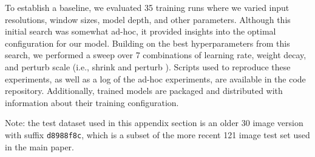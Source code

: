 To establish a baseline, we evaluated 35 training runs where we varied input resolutions, window sizes,
  model depth, and other parameters.
Although this initial search was somewhat ad-hoc, it provided insights into the optimal configuration for
  our model.
Building on the best hyperparameters from this search, we performed a sweep over 7 combinations of learning
  rate, weight decay, and perturb scale (i.e., shrink and perturb
  \cite{ash_warm_starting_2020,dohare_loss_2023}).
Scripts used to reproduce these experiments, as well as a log of the ad-hoc experiments, are available in
  the code repository.
Additionally, trained models are packaged and distributed with information about their training
  configuration.

Note:
the test dataset used in this appendix section is an older 30 image version with suffix {\tt d8988f8c},
  which is a subset of the more recent 121 image test set used in the main paper.


